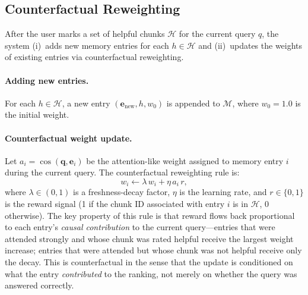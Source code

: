 \documentclass[preprint,12pt]{elsarticle}
\begin{document}
\subsection{Counterfactual Reweighting}
\label{sec:cfr}
After the user marks a set of helpful chunks $\mathcal{H}$ for the current
query $q$, the system (i)~adds new memory entries for each $h\in\mathcal{H}$
and (ii)~updates the weights of existing entries via counterfactual reweighting.

\paragraph{Adding new entries.}
For each $h\in\mathcal{H}$, a new entry
$(\mathbf{e}_{\text{new}}, h, w_0)$ is appended to $\mathcal{M}$, where
$w_0 = 1.0$ is the initial weight.

\paragraph{Counterfactual weight update.}
Let $a_i = \cos(\mathbf{q}, \mathbf{e}_i)$ be the attention-like weight
assigned to memory entry $i$ during the current query.  The counterfactual
reweighting rule is:
\begin{equation}
w_i \leftarrow \lambda\,w_i + \eta\,a_i\,r,
\label{eq:update}
\end{equation}
where $\lambda \in (0,1)$ is a freshness-decay factor, $\eta$ is the learning
rate, and $r\in\{0,1\}$ is the reward signal (1 if the chunk ID associated
with entry $i$ is in $\mathcal{H}$, 0 otherwise).  The key property of this
rule is that reward flows back proportional to each entry's \emph{causal
contribution} to the current query---entries that were attended strongly and
whose chunk was rated helpful receive the largest weight increase; entries that
were attended but whose chunk was not helpful receive only the decay.  This is
counterfactual in the sense that the update is conditioned on what the entry
\emph{contributed} to the ranking, not merely on whether the query was
answered correctly.
\end{document}

